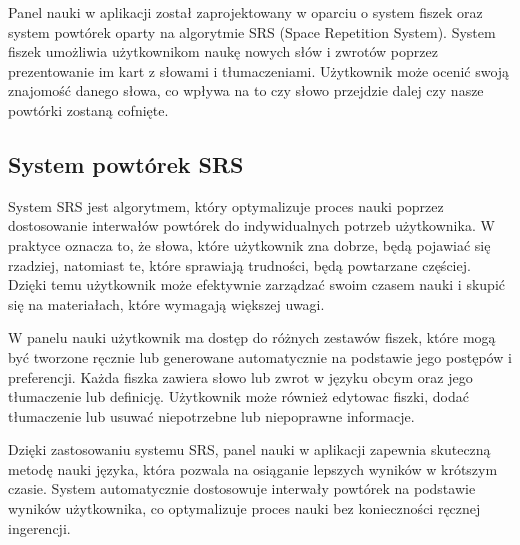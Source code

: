 Panel nauki w aplikacji został zaprojektowany w oparciu o system fiszek oraz system powtórek oparty na algorytmie SRS (Space Repetition System). System fiszek umożliwia użytkownikom naukę nowych słów i zwrotów poprzez prezentowanie im kart z słowami i tłumaczeniami. Użytkownik może ocenić swoją znajomość danego słowa, co wpływa na to czy słowo przejdzie dalej czy nasze powtórki zostaną cofnięte.

\subsection*{System powtórek SRS}

System SRS jest algorytmem, który optymalizuje proces nauki poprzez dostosowanie interwałów powtórek do indywidualnych potrzeb użytkownika. W praktyce oznacza to, że słowa, które użytkownik zna dobrze, będą pojawiać się rzadziej, natomiast te, które sprawiają trudności, będą powtarzane częściej. Dzięki temu użytkownik może efektywnie zarządzać swoim czasem nauki i skupić się na materiałach, które wymagają większej uwagi.

W panelu nauki użytkownik ma dostęp do różnych zestawów fiszek, które mogą być tworzone ręcznie lub generowane automatycznie na podstawie jego postępów i preferencji. Każda fiszka zawiera słowo lub zwrot w języku obcym oraz jego tłumaczenie lub definicję. Użytkownik może również edytowac fiszki, dodać tłumaczenie lub usuwać niepotrzebne lub niepoprawne informacje.

Dzięki zastosowaniu systemu SRS, panel nauki w aplikacji zapewnia skuteczną metodę nauki języka, która pozwala na osiąganie lepszych wyników w krótszym czasie. System automatycznie dostosowuje interwały powtórek na podstawie wyników użytkownika, co optymalizuje proces nauki bez konieczności ręcznej ingerencji.






